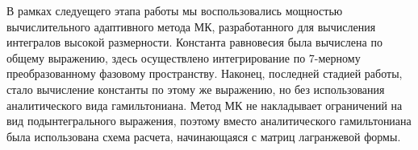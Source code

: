 \documentclass[12pt]{article}
\begin{document}
В рамках следуещего этапа работы мы воспользовались мощностью вычислительного адаптивного метода МК, разработанного для вычисления интегралов высокой размерности. Константа равновесия была вычислена по общему выражению, здесь осуществлено интегрирование по 7-мерному преобразованному фазовому пространству. Наконец, последней стадией работы, стало вычисление константы по этому же выражению, но без использования аналитического вида гамильтониана. Метод МК не накладывает ограничений на вид подынтегрального выражения, поэтому вместо аналитического гамильтониана была использована схема расчета, начинающаяся с матриц лагранжевой формы. 
\end{document}
